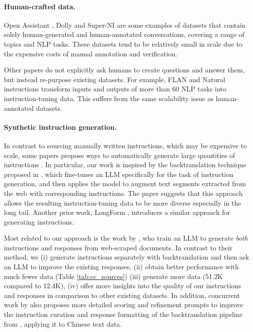 \paragraph{Human-crafted data.} Open Assistant \cite{kopf2024openassistant}, Dolly \cite{DatabricksBlog2023DollyV2} and Super-NI \cite{wang2022super} are some examples of datasets that contain solely human-generated and human-annotated conversations, covering a range of topics and NLP tasks. These datasets tend to be relatively small in scale due to the expensive costs of manual annotation and verification.

Other papers do not explicitly ask humans to create questions and answer them, but instead re-purpose existing datasets. For example, FLAN \cite{longpre2023flan} and Natural instructions \cite{mishra2021cross} transform inputs and outputs of more than 60 NLP tasks into instruction-tuning data. This suffers from the same scalability issue as human-annotated datasets.
\vspace{-0.25em}
\paragraph{Synthetic instruction generation.} In contrast to sourcing manually written instructions, which may be expensive to scale, some papers propose ways to automatically generate large quantities of instructions \cite{wang2022self, taori2023alpaca}. In particular, our work is inspired by the backtranslation technique proposed in \citet{li2023self}, which fine-tunes an LLM specifically for the task of instruction generation, and then applies the model to augment text segments extracted from the web with corresponding instructions. The paper suggests that this approach allows the resulting instruction-tuning data to be more diverse especially in the long tail. Another prior work, LongForm \cite{koksal2023longform}, introduces a similar approach for generating instructions.

Most related to our approach is the work by \citet{chen2023tegit}, who train an LLM to generate \textit{both} instructions and responses from web-scraped documents. %
In contrast to their method, we (i) generate instructions separately with backtranslation and then ask an LLM to improve the existing responses, (ii) obtain better performance with much fewer data (Table \ref{tab:cc_sources}) (iii) generate more data (51.2K compared to 12.4K), (iv) offer more insights into the quality of our instructions and responses in comparison to other existing datasets. In addition, concurrent work by \citet{zheng2024kun} also proposes more detailed scoring and refinement prompts to improve the instruction curation and response formatting of the backtranslation pipeline from \citet{li2023self}, applying it to Chinese text data.
\vspace{-0.25em}
